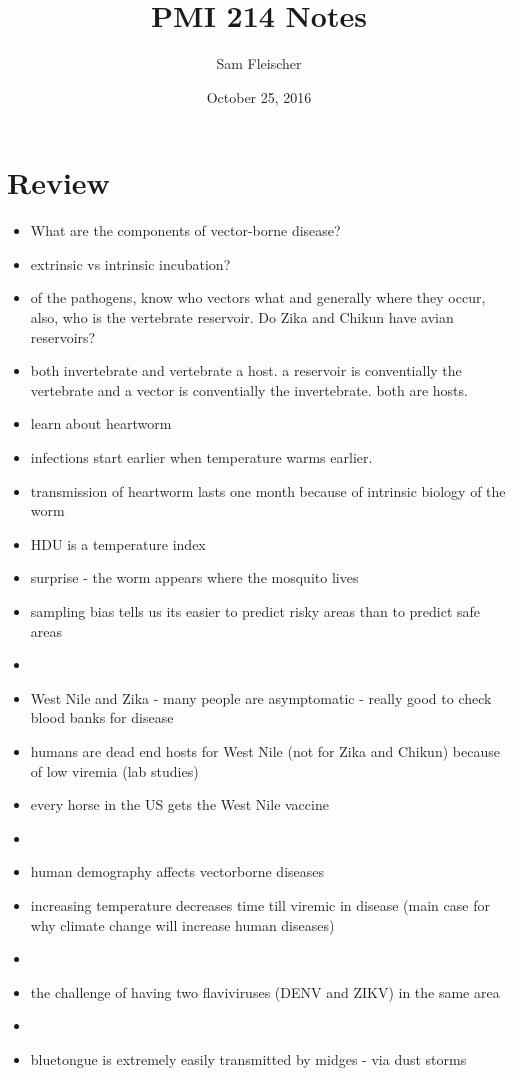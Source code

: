 \documentclass{article}
\title{PMI 214 Notes}
\author{Sam Fleischer}
\date{October 25, 2016}
\begin{document}
    \maketitle

    \section{Review}
    \begin{itemize}
        \item What are the components of vector-borne disease?
        \item extrinsic vs intrinsic incubation?
        \item of the pathogens, know who vectors what and generally where they occur, also, who is the vertebrate reservoir.  Do Zika and Chikun have avian reservoirs?
        \item both invertebrate and vertebrate a host.  a reservoir is conventially the vertebrate and a vector is conventially the invertebrate.  both are hosts.
        \item learn about heartworm
        \item infections start earlier when temperature warms earlier.
        \item transmission of heartworm lasts one month because of intrinsic biology of the worm
        \item HDU is a temperature index
        \item surprise - the worm appears where the mosquito lives
        \item sampling bias tells us its easier to predict risky areas than to predict safe areas
        \item 
        \item West Nile and Zika - many people are asymptomatic - really good to check blood banks for disease
        \item humans are dead end hosts for West Nile (not for Zika and Chikun) because of low viremia (lab studies)
        \item every horse in the US gets the West Nile vaccine
        \item 
        \item human demography affects vectorborne diseases
        \item increasing temperature decreases time till viremic in disease (main case for why climate change will increase human diseases)
        \item 
        \item the challenge of having two flaviviruses (DENV and ZIKV) in the same area
        \item 
        \item bluetongue is extremely easily transmitted by midges - via dust storms
    \end{itemize}
\end{document}
